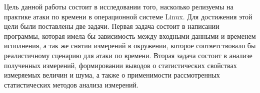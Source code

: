 Цель данной работы состоит в исследовании того, насколько релизуемы на практике
атаки по времени в операционной системе Linux. Для достижения этой цели были
поставлены две задачи. Первая задача состоит в написании программы, которая
имела бы зависимость между входными данными и временем исполнения, а так же
снятии измерений в окружении, которое соответствовало бы реалистичному сценарию
для атаки по времени. Вторая задача состоит в анализе полученных измерений,
формировании выводов о статистических свойствах измеряемых величин и шума, а также
о применимости рассмотренных статистических методов анализа измерений.

\clearpage

